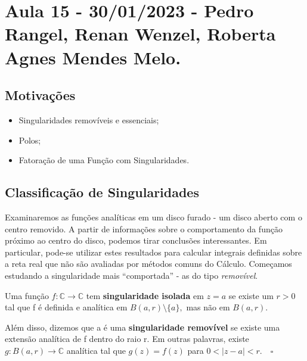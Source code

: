 \documentclass[ComplexAnalysis/complex.tex]{subfiles}
\begin{document}
\section{Aula 15 - 30/01/2023 - Pedro Rangel, Renan Wenzel, Roberta Agnes Mendes Melo.}
\subsection{Motivações}
\begin{itemize}
	\item Singularidades removíveis e essenciais;
	\item Polos;
	\item Fatoração de uma Função com Singularidades.
\end{itemize}
\subsection{Classificação de Singularidades}
Examinaremos as funções analíticas em um disco furado - um disco aberto com o centro removido. A partir de informações sobre
o comportamento da função próximo ao centro do disco, podemos tirar conclusões interessantes. Em particular, pode-se utilizar estes resultados
para calcular integrais definidas sobre a reta real que não são avaliadas por métodos comuns do Cálculo.
Começamos estudando a singularidade mais ``comportada'' - as do tipo \textit{removível}.
\begin{def*}
	Uma função \(f:\mathbb{C}\rightarrow \mathbb{C}\) tem \textbf{singularidade isolada} em \(z = a\) se existe um \(r > 0\)
	tal que f é definida e analítica em \(B(a, r)\setminus{\{a\}},\) mas não em \(B(a, r).\)

	Além disso, dizemos que a é uma \textbf{singularidade removível} se existe uma extensão analítica de f dentro do raio r.
	Em outras palavras, existe \(g:B(a, r)\rightarrow \mathbb{C}\) analítica tal que \(g(z) = f(z)\) para \(0 < |z-a| < r.\quad \square\)
\end{def*}
\end{document}
